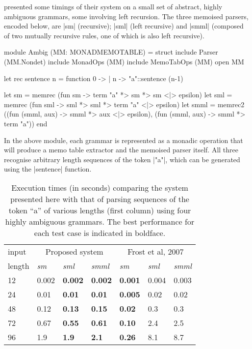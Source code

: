 \citet{FrostHafizCallaghan2007} presented
some timings of their system on a small set of abstract, highly ambiguous grammars,
some involving left recursion.
The three memoised parsers, encoded below, are |sm| (recursive); |sml| (left recursive) and |smml| (composed of
two mutually recursive rules, one of which is also left recursive).
\begin{ocaml}
	module Ambig (MM: MONADMEMOTABLE) = struct
		include Parser (MM.Nondet)
		include MonadOps (MM)
		include MemoTabOps (MM)
		open MM

		let rec sentence n = function 0 -> {} | n -> "a"::sentence (n-1)

		let sm = memrec (fun sm -> term "a" *> sm *> sm <|> epsilon)
		let sml = memrec (fun sml -> sml *> sml *> term "a" <|> epsilon)
		let smml = memrec2 ((fun (smml, aux) -> smml *> aux <|> epsilon),
													 (fun (smml, aux) -> smml *> term "a"))
	end
\end{ocaml}
In the above module, each grammar is represented as a monadic operation that will
produce a memo table extractor and the memoised parser itself. All three recognise arbitrary length sequences of the
token |"a"|, which can be generated using the |sentence| function.

\begin{table}
	\begin{center}
		\begin{tabular}{l|lll|lll}
			input & \multicolumn{3}{c|}{Proposed system} & \multicolumn{3}{c}{Frost et al, 2007} \\
			length & \textit{sm} & \textit{sml} & \textit{smml} &  \textit{sm} & \textit{sml} & \textit{smml} \\[0.1em]
			\hline 
			12 & 0.002 & \textbf{0.002} & \textbf{0.002} &  \textbf{0.001} & 0.004 & 0.003 \\
			24 & 0.01 & \textbf{0.01} & \textbf{0.01}    &  \textbf{0.005} & 0.02 & 0.02 \\
			48 & 0.12 & \textbf{0.13} & \textbf{0.15}    &  \textbf{0.02} & 0.3 & 0.3 \\
			72 & 0.67 & \textbf{0.55} & \textbf{0.61}    &  \textbf{0.10} & 2.4 & 2.5 \\
			96 & 1.9 & \textbf{1.9} & \textbf{2.1}       &  \textbf{0.26} & 8.1 & 8.7 \\
		\end{tabular}
	\end{center}
	\caption{Execution times (in seconds) comparing the system presented here with that of \citet{FrostHafizCallaghan2007}
parsing sequences of the token ``a'' of various lengths (first column) using four highly ambiguous grammars. The
best performance for each test case is indicated in boldface.}
	\label{tab:timings}
\end{table}

